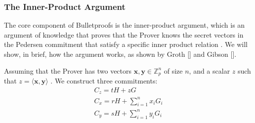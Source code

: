 \documentclass[sigconf,screen,nonacm]{acmart}
\begin{document}
  \subsubsection{The Inner-Product Argument}

  The core component of Bulletproofs is the inner-product argument, which is an
  argument of knowledge that proves that the Prover knows the secret vectors in
  the Pedersen commitment that satisfy a specific inner product relation
  \cite{Bunz17}. We will show, in brief, how the argument works, as shown by
  Groth [\citeyear{Groth09}] and Gibson [\citeyear{Gibson22}].

  Assuming that the Prover has two vectors $\mathbf{x}, \mathbf{y} \in \mathbb{Z}_p^n$
  of size $n$, and a scalar $z$ such that $z = \langle \mathbf{x}, \mathbf{y} \rangle$
  \cite{Gibson22}. We construct three commitments:
  \begin{align}
    C_z = tH + zG \\
    C_x = rH + \sum_{i=1}^n x_i G_i \\
    C_y = sH + \sum_{i=1}^n y_i G_i
  \end{align}
\end{document}
